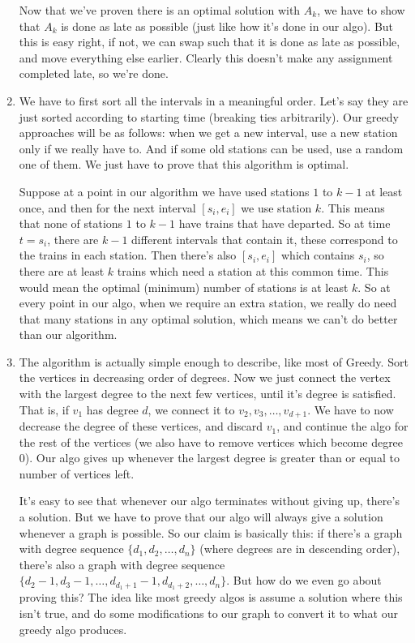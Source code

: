 \documentclass[12pt]{report}
\begin{document}
\begin{enumerate}[label=\textbf{\arabic*.}]
  Now that we've proven there is an optimal solution with $A_k$, we have to show that $A_k$ is done as late as possible (just like how it's done in our algo). 
  But this is easy right, if not, we can swap such that it is done as late as possible, and move everything else earlier. Clearly this doesn't make any assignment completed
  late, so we're done.

  \item We have to first sort all the intervals in a meaningful order. Let's say they are just sorted according to starting time (breaking ties arbitrarily). Our 
  greedy approaches will be as follows: when we get a new interval, use a new station only if we really have to. And if some old stations can be used, use a random
  one of them. We just have to prove that this algorithm is optimal.

  Suppose at a point in our algorithm we have used stations $1$ to $k-1$ at least once, and then for the next interval $[s_i, e_i]$ we use station $k$. This means 
  that none of stations $1$ to $k-1$ have trains that have departed. So at time $t = s_i$, there are $k-1$ different intervals that contain it, these correspond
  to the trains in each station. Then there's also $[s_i, e_i]$ which contains $s_i$, so there are at least $k$ trains which need a station at this common time.
  This would mean the optimal (minimum) number of stations is at least $k$. So at every point in our algo, when we require an extra station, we really do need that 
  many stations in any optimal solution, which means we can't do better than our algorithm.

  \item The algorithm is actually simple enough to describe, like most of Greedy. Sort the vertices in decreasing order of degrees. Now we just connect the vertex
  with the largest degree to the next few vertices, until it's degree is satisfied. That is, if $v_1$ has degree $d$, we connect it to $v_2, v_3, \dots, v_{d+1}$.
  We have to now decrease the degree of these vertices, and discard $v_1$, and continue the algo for the rest of the vertices (we also have to remove vertices which
  become degree 0). Our algo gives up whenever the largest degree is greater than or equal to number of vertices left.

  It's easy to see that whenever our algo terminates without giving up, there's a solution. But we have to prove that our algo will always give a solution whenever
  a graph is possible. So our claim is basically this: if there's a graph with degree sequence $\{d_1, d_2, \dots, d_n\}$ (where degrees are in descending order), 
  there's also a graph with degree sequence $\{d_2 - 1, d_3 - 1, \dots, d_{d_1+1} - 1, d_{d_1+2}, \dots, d_n\}$. But how do we even go about proving this? The idea like
  most greedy algos is assume a solution where this isn't true, and do some modifications to our graph to convert it to what our greedy algo produces.


\end{enumerate}
\end{document}
